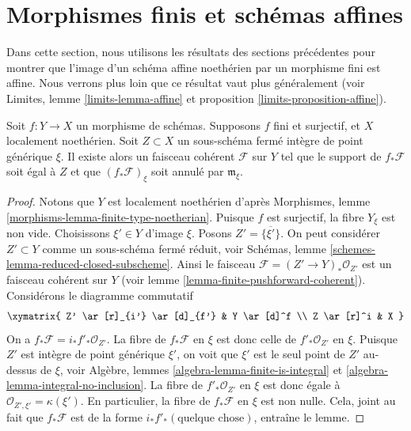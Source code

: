 \section{Morphismes finis et schémas affines}
\label{section-finite-affine}

\noindent
Dans cette section, nous utilisons les résultats des sections précédentes
pour montrer que l'image d'un schéma affine noethérien par un morphisme fini
est affine. Nous verrons plus loin que ce résultat vaut plus
généralement (voir Limites, lemme \ref{limits-lemma-affine} et
proposition \ref{limits-proposition-affine}).

\begin{lemma}
\label{lemma-finite-morphism-Noetherian}
Soit $f : Y \to X$ un morphisme de schémas.
Supposons $f$ fini et surjectif, et $X$ localement noethérien.
Soit $Z \subset X$ un sous-schéma fermé intègre de
point générique $\xi$. Il
existe alors un faisceau cohérent $\mathcal{F}$ sur $Y$
tel que le support de $f_*\mathcal{F}$ soit égal à $Z$
et que $(f_*\mathcal{F})_\xi$ soit annulé par $\mathfrak m_\xi$.
\end{lemma}

\begin{proof}
Notons que $Y$ est localement noethérien d'après
Morphismes, lemme \ref{morphisms-lemma-finite-type-noetherian}.
Puisque $f$ est surjectif, la fibre $Y_\xi$ est non vide.
Choisissons $\xi' \in Y$ d'image $\xi$. Posons $Z' = \overline{\{\xi'\}}$.
On peut considérer $Z' \subset Y$ comme un sous-schéma fermé réduit,
voir Schémas, lemme \ref{schemes-lemma-reduced-closed-subscheme}.
Ainsi le faisceau $\mathcal{F} = (Z' \to Y)_*\mathcal{O}_{Z'}$
est un faisceau cohérent sur $Y$ (voir
lemme \ref{lemma-finite-pushforward-coherent}).
Considérons le diagramme commutatif
$$
\xymatrix{
Z' \ar[r]_{i'} \ar[d]_{f'} &
Y \ar[d]^f \\
Z \ar[r]^i &
X
}
$$
On a $f_*\mathcal{F} = i_*f'_*\mathcal{O}_{Z'}$.
La fibre de $f_*\mathcal{F}$ en $\xi$ est donc celle
de $f'_*\mathcal{O}_{Z'}$ en $\xi$. Puisque $Z'$ est
intègre de point générique $\xi'$, on voit que
$\xi'$ est le seul point de $Z'$ au-dessus de $\xi$, voir
Algèbre, lemmes \ref{algebra-lemma-finite-is-integral} et
\ref{algebra-lemma-integral-no-inclusion}.
La fibre de $f'_*\mathcal{O}_{Z'}$ en $\xi$
est donc égale à $\mathcal{O}_{Z', \xi'} = \kappa(\xi')$. En particulier,
la fibre de $f_*\mathcal{F}$ en $\xi$ est non nulle.
Cela, joint au fait que $f_*\mathcal{F}$ est
de la forme $i_*f'_*(\text{quelque chose})$, entraîne le lemme.
\end{proof}

